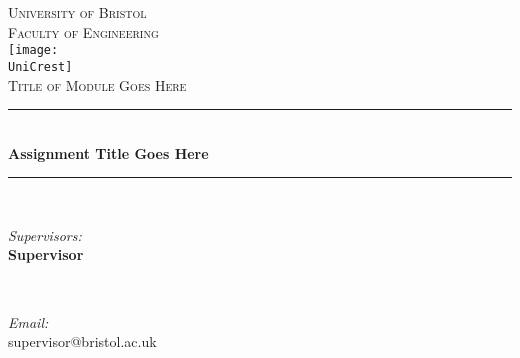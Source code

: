 \documentclass{article}
\makeatletter
\newcommand{\AssignmentTitle}{Assignment Title Goes Here}
\newcommand{\ModuleTitle}{Title of Module Goes Here}
\newcommand{\University}{University of Bristol}
\newcommand{\Faculty}{Faculty of Engineering}
\newcommand{\UniCrest}{crestbris.png}
\newcommand{\SupervisorNameA}{Supervisor}
\newcommand{\SupervisorEmailA}{supervisor@bristol.ac.uk}
\newcommand{\horrule}[1]{\rule{\linewidth}{#1}}
\makeatother
\begin{document}
\begin{titlepage}

	\center %
		\normalfont \normalsize \textsc{\University} \\ [10pt]
		\normalfont \normalsize \textsc{\Faculty} \\ [25pt]
		\texttt{[image: \\UniCrest]}\\[0.5cm]
		\normalfont \normalsize \textsc{\ModuleTitle} \\ [25pt]
		\horrule{0.5pt} \\[0.4cm]
		\huge \textbf{\AssignmentTitle} \\
		\horrule{2pt} \\[0.5cm]
\begin{minipage}{0.4\textwidth}
\begin{flushleft} \large
\emph{Supervisors:}\\
\textbf{\SupervisorNameA}
\end{flushleft}
\end{minipage}
~
\begin{minipage}{0.4\textwidth}
\begin{flushright} \large
\emph{Email:} \\
\SupervisorEmailA


\end{flushright}
\end{minipage}
\end{titlepage}
\end{document}
